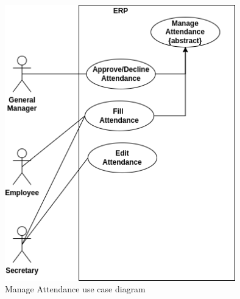 \begin{figure}[!ht]
\centering
\includegraphics[width=10cm,keepaspectratio]{usecases/attendance.drawio.png}
\caption{Manage Attendance use case diagram }
\end{figure}

\clearpage





